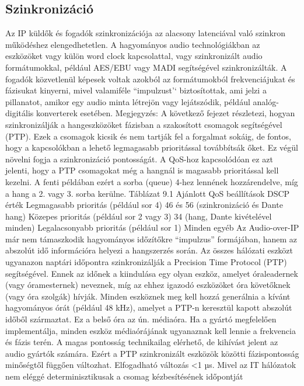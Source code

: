 \subsection{Szinkronizáció}
Az IP küldők és fogadók szinkronizációja az alacsony latenciával való szinkron
működéshez elengedhetetlen. A hagyományos audio technológiákban az eszközöket
vagy külön word clock kapcsolattal, vagy szinkronizált audio formátumokkal,
például AES/EBU vagy MADI segítségével szinkronizálták. A fogadók közvetlenül
képesek voltak azokból az formátumokból frekvenciájukat és fázisukat kinyerni,
mivel valamiféle ``impulzust'` biztosítottak, ami jelzi a pillanatot, amikor egy
audio minta létrejön vagy lejátszódik, például analóg-digitális konverterek
esetében. Megjegyzés: A következő fejezet részletezi, hogyan szinkronizálják a
hangeszközöket fázisban a szakosított csomagok segítségével (PTP). Ezek a
csomagok kicsik és nem tartják fel a forgalmat sokáig, de fontos, hogy a
kapcsolókban a lehető legmagasabb prioritással továbbítsák őket. Ez végül
növelni fogja a szinkronizáció pontosságát. A QoS-hoz kapcsolódóan ez azt
jelenti, hogy a PTP csomagokat még a hangnál is magasabb prioritással kell
kezelni. A fenti példában ezért a sorba (queue) 4-hez lennének hozzárendelve,
míg a hang a 2. vagy 3. sorba kerülne. Táblázat 9.1 Ajánlott QoS beállítások
DSCP érték Legmagasabb prioritás (például sor 4) 46 és 56 (szinkronizáció és
Dante hang) Közepes prioritás (például sor 2 vagy 3) 34 (hang, Dante kivételével
minden) Legalacsonyabb prioritás (például sor 1) Minden egyéb Az Audio-over-IP
már nem támaszkodik hagyományos időzítőkre ``impulzus'' formájában, hanem az
abszolút idő információra helyezi a hangszerzés során. Az összes hálózati
eszközt ugyanazon naptári időpontra szinkronizálják a Precision Time Protocol
(PTP) segítségével. Ennek az időnek a kiindulása egy olyan eszköz, amelyet
óraleadernek (vagy óramesternek) neveznek, míg az ehhez igazodó eszközöket óra
követőknek (vagy óra szolgák) hívják. Minden eszköznek meg kell hozzá generálnia
a kívánt hagyományos órát (például 48 kHz), amelyet a PTP-n keresztül kapott
abszolút időből származtat. Ez a belső óra az ún. médiaóra. Ha a gyártó
megfelelően implementálja, minden eszköz médiaórájának ugyanaznak kell lennie a
frekvencia és fázis terén. A magas pontosság technikailag elérhető, de kihívást
jelent az audio gyártók számára. Ezért a PTP szinkronizált eszközök közötti
fázispontosság minőségtől függően változhat. Elfogadható változás <1 µs. Mivel
az IT hálózatok nem eléggé determinisztikusak a csomag kézbesítésének időpontját
